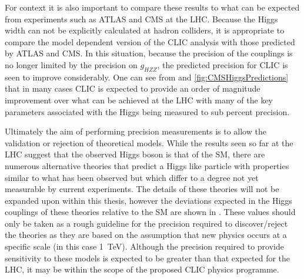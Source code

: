 For context it is also important to compare these results to what can be expected from experiments such as ATLAS and CMS at the LHC. Because the Higgs width can not be explicitly calculated at hadron colliders, it is appropriate to compare the model dependent version of the CLIC analysis with those predicted by ATLAS and CMS. In this situation, because the precision of the couplings is no longer limited by the precision on $g_{HZZ}$, the predicted precision for CLIC is seen to improve considerably. One can see from  and \ref{fig:CMSHiggsPredictions} that in many cases CLIC is expected to provide an order of magnitude improvement over what can be achieved at the LHC with many of the key parameters associated with the Higgs being measured to sub percent precision.

Ultimately the aim of performing precision measurements is to allow the validation or rejection of theoretical models. While the results seen so far at the LHC suggest that the observed Higgs boson is that of the \ac{SM}, there are numerous alternative theories that predict a Higgs like particle with properties similar to what has been observed but which differ to a degree not yet measurable by current experiments. The details of these theories will not be expanded upon within this thesis, however the deviations expected in the Higgs couplings of these theories relative to the \ac{SM} are shown in . These values should only be taken as a rough guideline for the precision required to discover/reject the theories as they are based on the assumption that new physics occurs at a specific scale (in this case 1~TeV). Although the precision required to provide sensitivity to these models is expected to be greater than that expected for the LHC, it may be within the scope of the proposed CLIC physics programme.  

